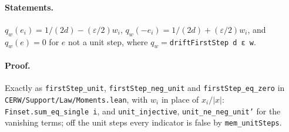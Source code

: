 \paragraph{Statements.} $q_w(e_i)=1/(2d)-(\varepsilon/2)w_i$, $q_w(-e_i)=1/(2d)+(\varepsilon/2)w_i$, and
$q_w(e)=0$ for $e$ not a unit step, where $q_w=$\texttt{driftFirstStep d ε w}.
\paragraph{Proof.} Exactly as \texttt{firstStep\_unit}, \texttt{firstStep\_neg\_unit} and
\texttt{firstStep\_eq\_zero} in \texttt{CERW/Support/Law/Moments.lean}, with $w_i$ in place of
$x_i/|x|$: \texttt{Finset.sum\_eq\_single i}, and \texttt{unit\_injective},
\texttt{unit\_ne\_neg\_unit'} for the vanishing terms; off the unit steps every indicator is false
by \texttt{mem\_unitSteps}.
